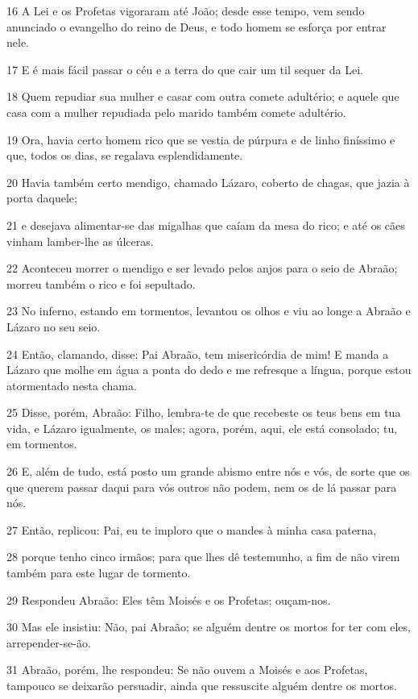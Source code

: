 \par 16 A Lei e os Profetas vigoraram até João; desde esse tempo, vem sendo anunciado o evangelho do reino de Deus, e todo homem se esforça por entrar nele.
\par 17 E é mais fácil passar o céu e a terra do que cair um til sequer da Lei.
\par 18 Quem repudiar sua mulher e casar com outra comete adultério; e aquele que casa com a mulher repudiada pelo marido também comete adultério.
\par 19 Ora, havia certo homem rico que se vestia de púrpura e de linho finíssimo e que, todos os dias, se regalava esplendidamente.
\par 20 Havia também certo mendigo, chamado Lázaro, coberto de chagas, que jazia à porta daquele;
\par 21 e desejava alimentar-se das migalhas que caíam da mesa do rico; e até os cães vinham lamber-lhe as úlceras.
\par 22 Aconteceu morrer o mendigo e ser levado pelos anjos para o seio de Abraão; morreu também o rico e foi sepultado.
\par 23 No inferno, estando em tormentos, levantou os olhos e viu ao longe a Abraão e Lázaro no seu seio.
\par 24 Então, clamando, disse: Pai Abraão, tem misericórdia de mim! E manda a Lázaro que molhe em água a ponta do dedo e me refresque a língua, porque estou atormentado nesta chama.
\par 25 Disse, porém, Abraão: Filho, lembra-te de que recebeste os teus bens em tua vida, e Lázaro igualmente, os males; agora, porém, aqui, ele está consolado; tu, em tormentos.
\par 26 E, além de tudo, está posto um grande abismo entre nós e vós, de sorte que os que querem passar daqui para vós outros não podem, nem os de lá passar para nós.
\par 27 Então, replicou: Pai, eu te imploro que o mandes à minha casa paterna,
\par 28 porque tenho cinco irmãos; para que lhes dê testemunho, a fim de não virem também para este lugar de tormento.
\par 29 Respondeu Abraão: Eles têm Moisés e os Profetas; ouçam-nos.
\par 30 Mas ele insistiu: Não, pai Abraão; se alguém dentre os mortos for ter com eles, arrepender-se-ão.
\par 31 Abraão, porém, lhe respondeu: Se não ouvem a Moisés e aos Profetas, tampouco se deixarão persuadir, ainda que ressuscite alguém dentre os mortos.

